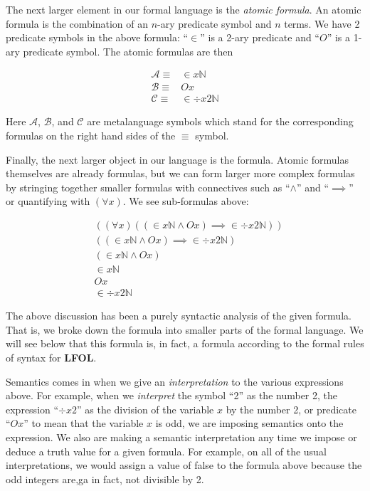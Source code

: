 \documentclass[12pt]{article}
\theoremstyle{break}
\theoremstyle{break}
\theoremstyle{break}
\theoremstyle{break}
\theoremstyle{break}
\newtheorem{informal definition}[definition]{Informal Definition}
\newcommand{\mc}[1]{\mathcal{#1}}
\newcommand{\qq}[1]{``#1''}
\begin{document}
The next larger element in our formal language is the \textit{atomic formula}.
An atomic formula is the combination of an $n$-ary predicate symbol and $n$ terms.
We have 2 predicate symbols in the above formula: \qq{$\in$} is a 2-ary predicate and \qq{$O$} is a 1-ary predicate symbol.
The atomic formulas are then

\begin{align*}
\mc{A} \equiv& \in x \mathbb{N}\\
\mc{B} \equiv& Ox\\
\mc{C} \equiv& \in \div x2 \mathbb{N}
\end{align*}

Here $\mc{A}$, $\mc{B}$, and $\mc{C}$ are metalanguage symbols which stand for the corresponding formulas on the right hand sides of the $\equiv$ symbol.

Finally, the next larger object in our language is the formula.
Atomic formulas themselves are already formulas, but we can form larger more complex formulas by stringing together smaller formulas with connectives such as \qq{$\land$} and \qq{$\implies$} or quantifying with $(\forall x)$.
We see sub-formulas above:

\begin{align*}
& ((\forall x)((\in x \mathbb{N} \land Ox)\implies \in \div x 2 \mathbb{N})) \\
& ((\in x \mathbb{N} \land Ox)\implies \in \div x 2 \mathbb{N}) \\
& (\in x \mathbb{N} \land Ox)\\
& \in x \mathbb{N}\\
& Ox \\
&  \in \div x 2 \mathbb{N}
\end{align*}

The above discussion has been a purely syntactic analysis of the given formula.
That is, we broke down the formula into smaller parts of the formal language.
We will see below that this formula is, in fact, a formula according to the formal rules of syntax for \textbf{LFOL}.

Semantics comes in when we give an \textit{interpretation} to the various expressions above.
For example, when we \textit{interpret} the symbol \qq{2} as the number 2, the expression \qq{$\div x 2$} as the division of the variable $x$ by the number 2, or predicate \qq{$Ox$} to mean that the variable $x$ is odd, we are imposing semantics onto the expression.
We also are making a semantic interpretation any time we impose or deduce a truth value for a given formula.
For example, on all of the usual interpretations, we would assign a value of false to the formula above because the odd integers are,ga in fact, not divisible by 2.
\end{document}
